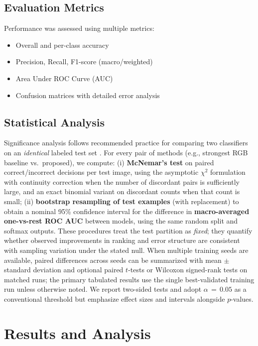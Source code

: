 \documentclass[conference]{IEEEtran}
\begin{document}
\subsection{Evaluation Metrics}
Performance was assessed using multiple metrics:
\begin{itemize}
    \item Overall and per-class accuracy
    \item Precision, Recall, F1-score (macro/weighted)
    \item Area Under ROC Curve (AUC)
    \item Confusion matrices with detailed error analysis
\end{itemize}

\subsection{Statistical Analysis}
Significance analysis follows recommended practice for comparing two classifiers on an \emph{identical} labeled test set \cite{dietterich1998}. For every pair of methods (e.g., strongest RGB baseline vs.\ proposed), we compute: (i) \textbf{McNemar's test} on paired correct/incorrect decisions per test image, using the asymptotic $\chi^2$ formulation with continuity correction when the number of discordant pairs is sufficiently large, and an exact binomial variant on discordant counts when that count is small; (ii) \textbf{bootstrap resampling of test examples} (with replacement) to obtain a nominal 95\% confidence interval for the difference in \textbf{macro-averaged one-vs-rest ROC AUC} between models, using the same random split and softmax outputs. These procedures treat the test partition as \emph{fixed}; they quantify whether observed improvements in ranking and error structure are consistent with sampling variation under the stated null. When multiple training seeds are available, paired differences across seeds can be summarized with mean $\pm$ standard deviation and optional paired $t$-tests or Wilcoxon signed-rank tests on matched runs; the primary tabulated results use the single best-validated training run unless otherwise noted. We report two-sided tests and adopt $\alpha\,{=}\,0.05$ as a conventional threshold but emphasize effect sizes and intervals alongside $p$-values.

\section{Results and Analysis}
\end{document}

